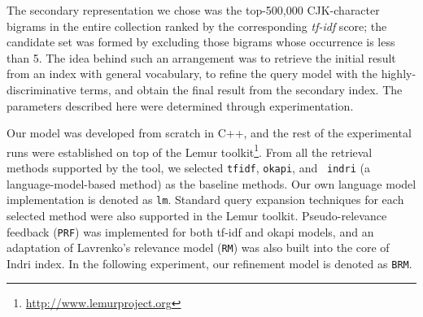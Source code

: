 
The secondary representation we chose was the top-500,000 CJK-character bigrams
in the entire collection ranked by the corresponding \emph{tf-idf} score; the
candidate set was formed by excluding those bigrams whose occurrence is less
than 5.  The idea behind such an arrangement was to retrieve the initial result
from an index with general vocabulary, to refine the query model with the
highly-discriminative terms, and obtain the final result from the secondary
index.  The parameters described here were determined through experimentation.

Our model was developed from scratch in C++, and the rest of the experimental
runs were established on top of the Lemur
toolkit\footnote{\url{http://www.lemurproject.org}}.  From all the retrieval
methods supported by the tool, we selected {\tt tfidf}, {\tt okapi}, and {\tt
indri} (a language-model-based method) as the baseline methods.  Our own
language model implementation is denoted as {\tt lm}.  Standard query expansion
techniques for each selected method were also supported in the Lemur toolkit.
Pseudo-relevance feedback ({\tt PRF}) was implemented for both tf-idf and okapi
models, and an adaptation of Lavrenko's relevance model ({\tt RM}) was also
built into the core of Indri index.  In the following experiment, our
refinement model is denoted as {\tt BRM}.  

